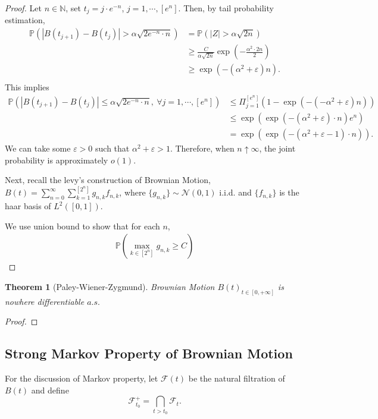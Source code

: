 \documentclass[11pt,english]{smfart}
\newtheorem{theorem}{Theorem}[subsection]
\newcommand{\mb}{\mathbb}
\newcommand{\mc}{\mathcal}
\begin{document}
\begin{proof}
    Let $n\in \mb{N}$, set $t_j = j\cdot e^{-n}$, $j = 1,\cdots,[e^n]$. Then, by tail probability estimation, \begin{align*}
        \mb{P}\left(|B(t_{j+1}) - B(t_j)| > \alpha \sqrt{2 e^{-n}\cdot n}\right) &= \mb{P}\left(|Z| > \alpha \sqrt{2n}\right) \\
        &\geq \frac{C}{\alpha\sqrt{2n}} \exp\left(-\frac{\alpha^2 \cdot 2n}{2}\right) \\
        &\geq \exp\left(-(\alpha^2 + \varepsilon) n\right).\\
    \end{align*}
    This implies \begin{align*}
        \mb{P}\left(\left|B(t_{j+1}) - B(t_j)\right| \leq \alpha \sqrt{2e^{-n}\cdot n},\ \forall j=1,\cdots,[e^n]\right) &\leq  \Pi_{j=1}^{[e^n]} \left(1- \exp(-(-\alpha^2 + \varepsilon)n)\right) \\
        &\leq \exp\left(\exp\left(-(\alpha^2 + \varepsilon) \cdot n\right)e^n\right) \\
        &=\exp\left(\exp\left(-(\alpha^2 + \varepsilon -1) \cdot n\right)\right).
    \end{align*}
    We can take some $\varepsilon > 0$ such that $\alpha^2 + \varepsilon > 1$. Therefore, when $n\uparrow \infty$, the joint probability is approximately $o(1)$. 

    Next, recall the levy's construction of Brownian Motion, $B(t) = \sum_{n=0}^\infty \sum_{k=1 }^{[2^n]} g_{n,k} f_{n,k}$, where $\{g_{n,k}\} \sim \mc{N}(0,1)$ i.i.d. and $\{f_{n,k}\}$ is the haar basis of $L^2([0,1])$.

    We use union bound to show that for each $n$, 
    \begin{align*}
        \mb{P}\left(\max_{k\in [2^n]} g_{n,k} \geq C\right)
    \end{align*}
\end{proof}

\begin{theorem}[Paley-Wiener-Zygmund]
 Brownian Motion $B(t)_{t\in [0,+\infty]}$ is nowhere differentiable $a.s.$
\end{theorem}

\begin{proof}
    
\end{proof}


\subsection{Strong Markov Property of Brownian Motion}
For the discussion of Markov property, let $\mc{F}(t)$ be the natural filtration of $B(t)$ and define $$\mc{F}^+_{t_0} = \bigcap_{t > t_0 }\mc{F}_t.$$
\end{document}
